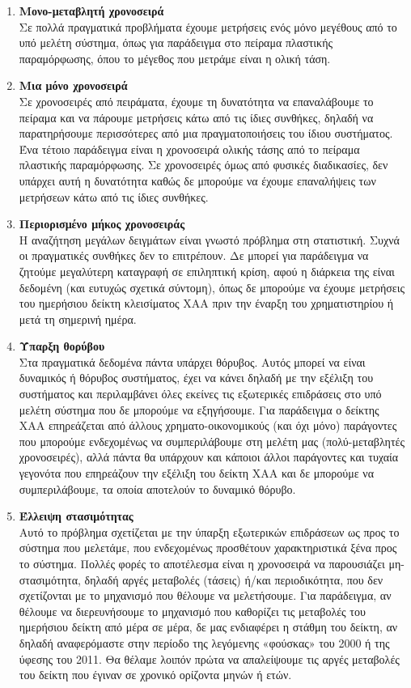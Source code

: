 \begin{enumerate}
\item \textbf{Μονο-μεταβλητή χρονοσειρά}\\
Σε πολλά πραγματικά προβλήματα έχουμε
μετρήσεις ενός μόνο μεγέθους από το υπό μελέτη σύστημα, όπως για παράδειγμα
στο πείραμα πλαστικής παραμόρφωσης, όπου το μέγεθος που μετράμε είναι η
ολική τάση.
\item \textbf{Μια μόνο χρονοσειρά}\\
Σε χρονοσειρές από πειράματα, έχουμε τη δυνατότητα να
επαναλάβουμε το πείραμα και να πάρουμε μετρήσεις κάτω από τις ίδιες συνθήκες,
δηλαδή να παρατηρήσουμε περισσότερες από μια πραγματοποιήσεις του ίδιου
συστήματος. Ένα τέτοιο παράδειγμα είναι η χρονοσειρά ολικής τάσης από το
πείραμα πλαστικής παραμόρφωσης. Σε χρονοσειρές όμως από φυσικές
διαδικασίες, δεν υπάρχει αυτή η δυνατότητα καθώς δε μπορούμε να έχουμε
επαναλήψεις των μετρήσεων κάτω από τις ίδιες συνθήκες.
\item \textbf{Περιορισμένο μήκος χρονοσειράς}\\
Η αναζήτηση μεγάλων δειγμάτων είναι γνωστό
πρόβλημα στη στατιστική. Συχνά οι πραγματικές συνθήκες δεν το επιτρέπουν. Δε
μπορεί για παράδειγμα να ζητούμε μεγαλύτερη καταγραφή σε επιληπτική κρίση,
αφού η διάρκεια της είναι δεδομένη (και ευτυχώς σχετικά σύντομη), όπως δε
μπορούμε να έχουμε μετρήσεις του ημερήσιου δείκτη κλεισίματος ΧΑΑ πριν την
έναρξη του χρηματιστηρίου ή μετά τη σημερινή ημέρα.
\item \textbf{Ύπαρξη θορύβου}\\
Στα πραγματικά δεδομένα πάντα υπάρχει θόρυβος. Αυτός μπορεί να είναι δυναμικός ή θόρυβος συστήματος, έχει να κάνει δηλαδή με την
εξέλιξη του συστήματος και περιλαμβάνει όλες εκείνες τις εξωτερικές επιδράσεις
στο υπό μελέτη σύστημα που δε μπορούμε να εξηγήσουμε. Για παράδειγμα ο
δείκτης ΧΑΑ επηρεάζεται από άλλους χρηματο-οικονομικούς (και όχι μόνο)
παράγοντες που μπορούμε ενδεχομένως να συμπεριλάβουμε στη μελέτη μας
(πολύ-μεταβλητές χρονοσειρές), αλλά πάντα θα υπάρχουν και κάποιοι άλλοι
παράγοντες και τυχαία γεγονότα που επηρεάζουν την εξέλιξη του δείκτη ΧΑΑ και
δε μπορούμε να συμπεριλάβουμε, τα οποία αποτελούν το δυναμικό θόρυβο.
\item \textbf{Έλλειψη στασιμότητας}\\
Αυτό το πρόβλημα σχετίζεται με την ύπαρξη εξωτερικών
επιδράσεων ως προς το σύστημα που μελετάμε, που ενδεχομένως προσθέτουν
χαρακτηριστικά ξένα προς το σύστημα. Πολλές φορές το αποτέλεσμα είναι η
χρονοσειρά να παρουσιάζει μη-στασιμότητα, δηλαδή αργές μεταβολές (τάσεις) ή/και
περιοδικότητα, που δεν σχετίζονται με το μηχανισμό που θέλουμε να μελετήσουμε.
Για παράδειγμα, αν θέλουμε να διερευνήσουμε το μηχανισμό που καθορίζει τις
μεταβολές του ημερήσιου δείκτη από μέρα σε μέρα, δε μας ενδιαφέρει η στάθμη του
δείκτη, αν δηλαδή αναφερόμαστε στην περίοδο της λεγόμενης «φούσκας» του 2000 ή
της ύφεσης του 2011. Θα θέλαμε λοιπόν πρώτα να απαλείψουμε τις αργές μεταβολές
του δείκτη που έγιναν σε χρονικό ορίζοντα μηνών ή ετών.

\end{enumerate}
